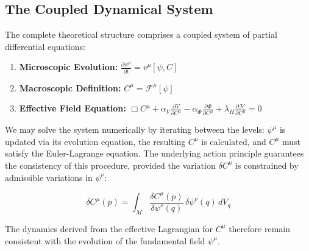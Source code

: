 
\subsection{The Coupled Dynamical System}
\label{6.5.2:the_coupled_dynamical_system}

The complete theoretical structure comprises a coupled system of partial differential equations:

\begin{enumerate}

    \item \textbf{Microscopic Evolution:} \(\displaystyle \frac{\partial \psi^\mu}{\partial t} = v^\mu[\psi, C]\)
    
    \item \textbf{Macroscopic Definition:} \(C^\mu = \mathcal{F}^\mu[\psi]\)
    
    \item \textbf{Effective Field Equation:} \(\Box C^\mu + \alpha_V \frac{\partial V}{\partial C^\mu} - \alpha_\Phi \frac{\partial \Phi}{\partial C^\mu} + \lambda_H \frac{\partial \mathcal{H}}{\partial C^\mu} = 0\)

\end{enumerate}

We may solve the system numerically by iterating between the levels: \(\psi^\mu\) is updated via its evolution equation, the resulting \(C^\mu\) is calculated, and \(C^\mu\) must satisfy the Euler-Lagrange equation. The underlying action principle guarantees the consistency of this procedure, provided the variation \(\delta C^\mu\) is constrained by admissible variations in \(\psi^\nu\):

\begin{equation}
\delta C^\mu(p) = \int_{\mathcal{M}} \frac{\delta C^\mu(p)}{\delta \psi^\nu(q)} \, \delta \psi^\nu(q) \, dV_q
\end{equation}

The dynamics derived from the effective Lagrangian for \(C^\mu\) therefore remain consistent with the evolution of the fundamental field \(\psi^\mu\).